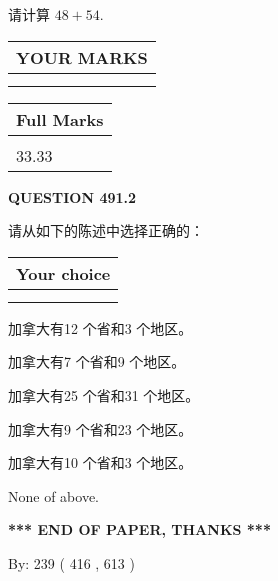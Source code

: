 \documentclass{ctexart}
\begin{document}
  
 
请计算 $ %
48 +  %
54 $.
 

 

 
  
\vspace{0.2in}
  
\noindent\begin{tabular}{|l|}
\hline
 YOUR MARKS  \\
\hline
 \\ 
 \\ 
\hline
\end{tabular}
\hspace{0.05in} \begin{tabular}{|l|}
\hline
 Full Marks  \\
\hline
 \\ 
33.33 \\
\hline
\end{tabular}
{\textbf{\Large{QUESTION
491.2 
}}}
  
  
请从如下的陈述中选择正确的：
  
  
\noindent\hspace{3.0in} \begin{tabular}{|l|}
\hline
Your choice \\
\hline
 \\ 
 \\ 
\hline
\end{tabular}
  
  
 
 
加拿大有12 个省和3 个地区。
 
 
加拿大有7 个省和9 个地区。
 
 
加拿大有25 个省和31 个地区。
 
 
加拿大有9 个省和23 个地区。
 
 
加拿大有10 个省和3 个地区。
 
 
 None of above.
 
 
   
   
 \vspace{0.2in}
 
   
   
   
   
\vspace{1.0in} 
{\textbf{\large{ *** END OF PAPER, THANKS *** }}} 
   
   
\hspace{1.0in} By: 
 239 ( 416 ,  613 )
   
\end{document}
